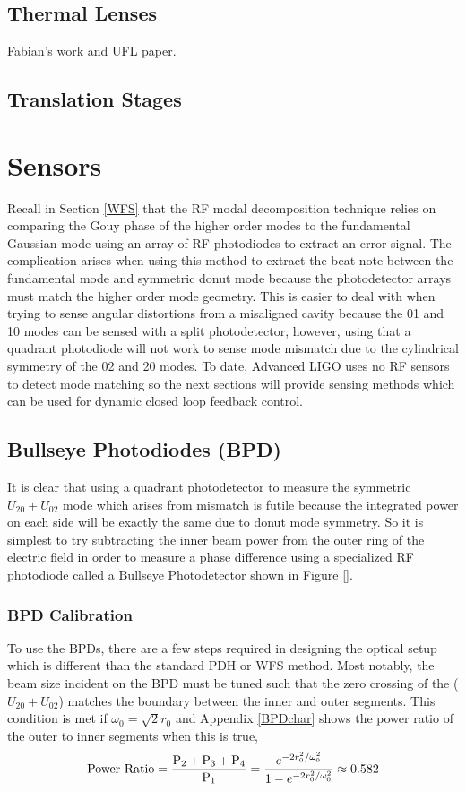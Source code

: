 		\subsection{Thermal Lenses}
		Fabian's work and UFL paper.
		\subsection{Translation Stages}
		
	\section{Sensors}
	Recall in Section \ref{WFS} that the RF modal decomposition technique relies on comparing the Gouy phase of the higher order modes to the fundamental Gaussian mode using an array of RF photodiodes to extract an error signal. 
	The complication arises when using this method to extract the beat note between the fundamental mode and symmetric donut mode because the photodetector arrays must match the higher order mode geometry.  
	This is easier to deal with when trying to sense angular distortions from a misaligned cavity because the 01 and 10 modes can be sensed with a split photodetector, however, using that a quadrant photodiode will not work to sense mode mismatch due to the cylindrical symmetry of the 02 and 20 modes. 
	To date, Advanced LIGO uses no RF sensors to detect mode matching so the next sections will provide sensing methods which can be used for dynamic closed loop feedback control.
	
		\subsection{Bullseye Photodiodes (BPD)}
		It is clear that using a quadrant photodetector to measure the symmetric $U_{20} + U_{02}$ mode which arises from mismatch is futile because the integrated power on each side will be exactly the same due to donut mode symmetry. So it is simplest to try subtracting the inner beam power from the outer ring of the electric field in order to measure a phase difference using a specialized RF photodiode called a Bullseye Photodetector shown in Figure []. 
		
		\subsubsection{BPD Calibration}
		To use the BPDs, there are a few steps required in designing the optical setup which is different than the standard PDH or WFS method.  Most notably, the beam size incident on the BPD must be tuned such that the zero crossing of the ($U_{20} + U_{02}$) matches the boundary between the inner and outer segments.  This condition is met if $\omega_{0} = \sqrt{2} r_0$ and Appendix \ref{BPDchar} shows the power ratio of the outer to inner segments when this is true,
		\begin{equation}
		\text{Power Ratio} = \frac{\text{P}_2 + \text{P}_3 + \text{P}_4}{\text{P}_1}  \\
		= \frac{e^{-2r_0^2/ \omega_{0}^2}} {1 - e^{-2r_0^2/ \omega_{0}^2 }} \approx 0.582
		\end{equation}
		
